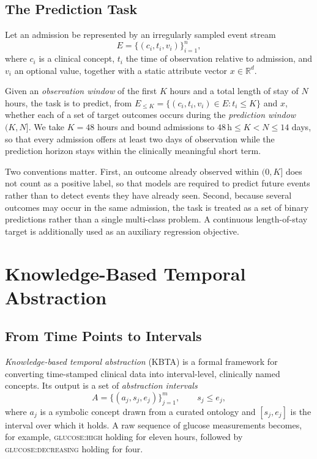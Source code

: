 \subsection{The Prediction Task}
\label{sec:prelim-task}

Let an admission be represented by an irregularly sampled event stream
\[
E = \{(c_i, t_i, v_i)\}_{i=1}^{n},
\]
where $c_i$ is a clinical concept, $t_i$ the time of observation relative to admission, and $v_i$ an optional value, together with a static attribute vector $x \in \mathbb{R}^{d}$.

Given an \emph{observation window} of the first $K$ hours and a total length of stay of $N$ hours, the task is to predict, from $E_{\le K} = \{(c_i,t_i,v_i) \in E : t_i \le K\}$ and $x$, whether each of a set of target outcomes occurs during the \emph{prediction window} $(K, N]$. We take $K = 48$ hours and bound admissions to $48\,\text{h} \le K < N \le 14$ days, so that every admission offers at least two days of observation while the prediction horizon stays within the clinically meaningful short term.

Two conventions matter. First, an outcome already observed within $(0, K]$ does not count as a positive label, so that models are required to predict future events rather than to detect events they have already seen. Second, because several outcomes may occur in the same admission, the task is treated as a set of binary predictions rather than a single multi-class problem. A continuous length-of-stay target is additionally used as an auxiliary regression objective.

\section{Knowledge-Based Temporal Abstraction}
\label{sec:prelim-kbta}

\subsection{From Time Points to Intervals}

\emph{Knowledge-based temporal abstraction} (KBTA) \citep{shahar1997framework} is a formal framework for converting time-stamped clinical data into interval-level, clinically named concepts. Its output is a set of \emph{abstraction intervals}
\[
A = \{(a_j, s_j, e_j)\}_{j=1}^{m}, \qquad s_j \le e_j,
\]
where $a_j$ is a symbolic concept drawn from a curated ontology and $[s_j, e_j]$ is the interval over which it holds. A raw sequence of glucose measurements becomes, for example, \textsc{glucose:high} holding for eleven hours, followed by \textsc{glucose:decreasing} holding for four.

